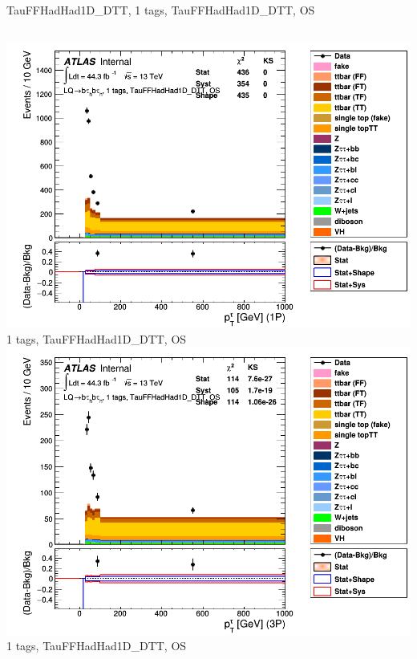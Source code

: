 \begin{frame}{TauFFHadHad1D\_DTT, 1 tags, TauFFHadHad1D\_DTT, OS}
  \begin{columns}[c]
    \centering\includegraphics[width=\textwidth]{C_1tag2pjet_0ptv_OS_TauPt1P}\\
    1 tags, TauFFHadHad1D\_DTT, OS
    \centering\includegraphics[width=\textwidth]{C_1tag2pjet_0ptv_OS_TauPt3P}\\
    1 tags, TauFFHadHad1D\_DTT, OS
  \end{columns}
  \begin{columns}[c]

\end{columns}
\end{frame}
